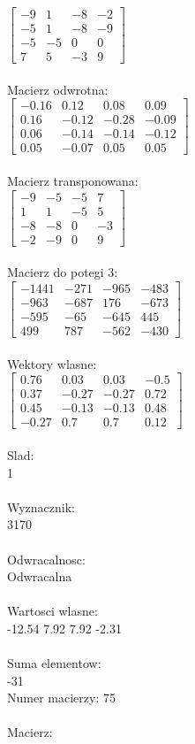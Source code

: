 \documentclass[a4paper,12pt]{article}
\begin{document}
$\begin{bmatrix} -9&1&-8&-2\\-5&1&-8&-9\\-5&-5&0&0\\7&5&-3&9 \end{bmatrix}$
\\
\\
Macierz odwrotna:\\

$\begin{bmatrix} -0.16&0.12&0.08&0.09\\0.16&-0.12&-0.28&-0.09\\0.06&-0.14&-0.14&-0.12\\0.05&-0.07&0.05&0.05 \end{bmatrix}$
\\
\\
Macierz transponowana:\\

$\begin{bmatrix} -9&-5&-5&7\\1&1&-5&5\\-8&-8&0&-3\\-2&-9&0&9 \end{bmatrix}$
\\
\\
Macierz do potegi 3:\\

$\begin{bmatrix} -1441&-271&-965&-483\\-963&-687&176&-673\\-595&-65&-645&445\\499&787&-562&-430 \end{bmatrix}$
\\
\\
Wektory wlasne:\\

$\begin{bmatrix} 0.76&0.03&0.03&-0.5\\0.37&-0.27&-0.27&0.72\\0.45&-0.13&-0.13&0.48\\-0.27&0.7&0.7&0.12 \end{bmatrix}$
\\
\\
Slad:\\
1
\\
\\
Wyznacznik:\\
3170
\\
\\
Odwracalnosc:\\
Odwracalna
\\
\\
Wartosci wlasne:\\
-12.54 7.92 7.92 -2.31
\\
\\
Suma elementow:\\
-31
\\
\newpage
Numer macierzy:
75
\\
\\
Macierz:\\
\end{document}
